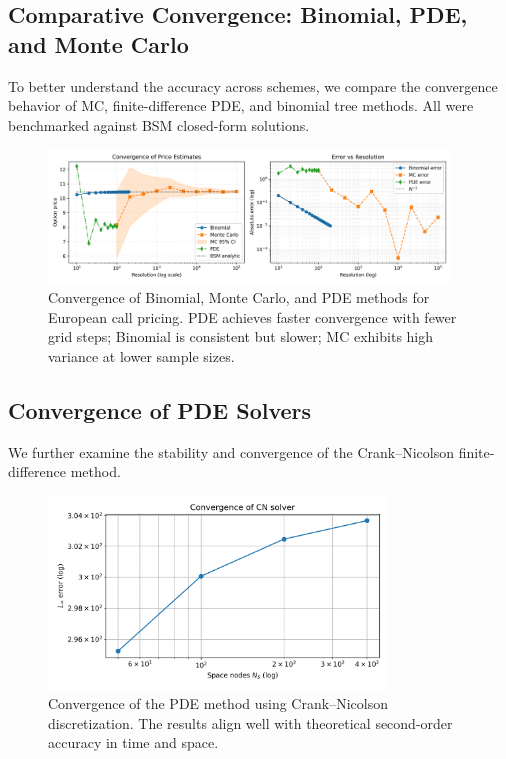 \documentclass[12pt,a4paper]{article}
\begin{document}
\subsection{Comparative Convergence: Binomial, PDE, and Monte Carlo}

To better understand the accuracy across schemes, we compare the convergence behavior of MC, finite-difference PDE, and binomial tree methods. All were benchmarked against BSM closed-form solutions.

\begin{figure}[H]
    \centering
    \includegraphics[width=0.95\textwidth]{../plots/mc_pde_binomial_convergence.png}
    \caption{Convergence of Binomial, Monte Carlo, and PDE methods for European call pricing. PDE achieves faster convergence with fewer grid steps; Binomial is consistent but slower; MC exhibits high variance at lower sample sizes.}
\end{figure}
\vspace{-5mm}

\subsection{Convergence of PDE Solvers}

We further examine the stability and convergence of the Crank–Nicolson finite-difference method.

\begin{figure}[H]
    \centering
    \includegraphics[width=0.8\textwidth]{../plots/PDE_convergence.png}
    \caption{Convergence of the PDE method using Crank–Nicolson discretization. The results align well with theoretical second-order accuracy in time and space.}
\end{figure}
\newpage
\end{document}
